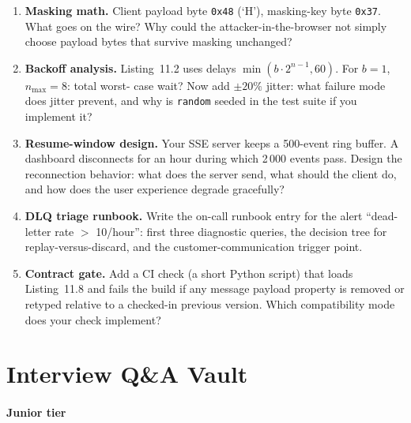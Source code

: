 \begin{enumerate}[label=\textbf{E11.\arabic*.}, leftmargin=2.2cm]
        payload \texttt{"hi"}. Then verify byte two's mask bit in each.
  \item \textbf{Masking math.} Client payload byte \texttt{0x48} (`H'),
        masking-key byte \texttt{0x37}. What goes on the wire? Why could the
        attacker-in-the-browser not simply choose payload bytes that survive
        masking unchanged?
  \item \textbf{Backoff analysis.} Listing~11.2 uses delays
        $\min(b \cdot 2^{n-1}, 60)$. For $b=1$, $n_{\max}=8$: total worst-
        case wait? Now add $\pm 20\%$ jitter: what failure mode does jitter
        prevent, and why is \texttt{random} seeded in the test suite if you
        implement it?
  \item \textbf{Resume-window design.} Your SSE server keeps a 500-event ring
        buffer. A dashboard disconnects for an hour during which 2\,000
        events pass. Design the reconnection behavior: what does the server
        send, what should the client do, and how does the user experience
        degrade gracefully?
  \item \textbf{DLQ triage runbook.} Write the on-call runbook entry for the
        alert ``dead-letter rate $>$ 10/hour'': first three diagnostic
        queries, the decision tree for replay-versus-discard, and the
        customer-communication trigger point.
  \item \textbf{Contract gate.} Add a CI check (a short Python script) that
        loads Listing~11.8 and fails the build if any message payload
        property is removed or retyped relative to a checked-in previous
        version. Which compatibility mode does your check implement?
\end{enumerate}

\section{Interview Q\&A Vault}
\label{sec:ch11-interview}

\paragraph{Junior tier}

